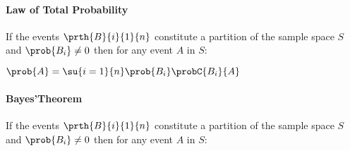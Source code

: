 \paragraph{Law of Total Probability}
If the events $\prth{B}{i}{1}{n}$ constitute a partition of the sample
space $S$ and $\prob{B_{i}}\neq 0$ then for any event $A$ in $S$:\\
\begin{center}
	$\prob{A}=\su{i=1}{n}\prob{B_{i}}\probC{B_{i}}{A}$
\end{center}


\paragraph{Bayes'Theorem}
If the events $\prth{B}{i}{1}{n}$ constitute a partition of the sample space $S$ and
$\prob{B_{i}}\neq 0$ then for any event $A$ in $S$:\\

\begin{center}
\end{center}
